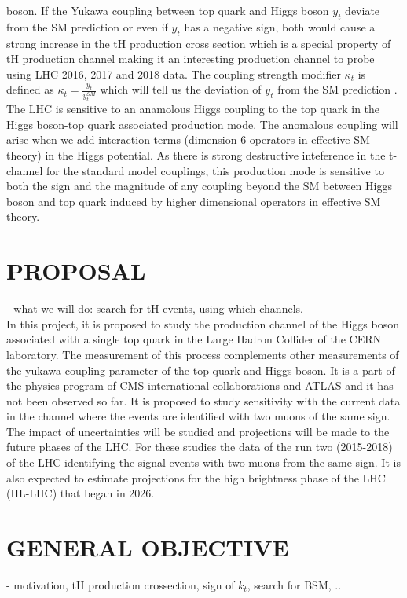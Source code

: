 \documentclass{article}
\begin{document}
boson. If the Yukawa coupling between top quark and Higgs boson $y_t$ deviate from the SM 
prediction or even if $y_t$ has a negative sign, both would cause a strong increase in the tH 
production cross section which is a special property of tH production channel making it an 
interesting production channel to probe using LHC 2016, 2017 and 2018 data. The coupling 
strength modifier $\kappa_t$ is defined as $\kappa_t = \frac{y_t}{y^{SM}_t}$ which will tell 
us the deviation of $y_t$ from the SM prediction \cite{sirunyan2019search}. 
The LHC is sensitive to an anamolous Higgs coupling to the top quark in the Higgs boson-top 
quark associated production mode. 
The anomalous coupling will arise when we add interaction terms (dimension 6 operators in 
effective SM theory) in the Higgs 
potential. As there is strong destructive inteference in the t-channel for the standard model 
couplings, this production mode 
is sensitive to both the sign and the magnitude of any coupling beyond the SM between Higgs 
boson and top quark induced by 
higher dimensional operators in effective SM theory.

\section{PROPOSAL}
- what we will do:  search for tH events, using which channels.\\  

\onehalfspacing In this project, it is proposed to study the production channel of the Higgs boson associated 
with a single top quark in the Large Hadron Collider of the CERN laboratory. The measurement 
of this process complements other measurements of the yukawa coupling parameter of the top 
quark and Higgs boson. It is a part of the physics program of CMS international 
collaborations and ATLAS and it has not been observed so far. It is proposed to study 
sensitivity with the current data in the channel where the events are identified with two 
muons of the same sign. The impact of uncertainties will be studied and projections will be 
made to the future phases of the LHC. For these studies the data of the run two (2015-2018) 
of the LHC identifying the signal events with two muons from the same sign. It is also 
expected to estimate projections for the high brightness phase of the LHC (HL-LHC) that began 
in 2026. 

\section{GENERAL OBJECTIVE}
- motivation, tH production crossection, sign of $k_t$, search for BSM, ..\\
\end{document}
